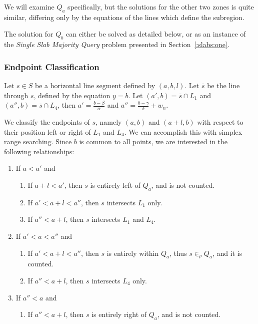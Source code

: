 We will examine $Q_a$ specifically, but the solutions for the other two zones is quite similar, differing only by the equations of the lines which define the subregion.

The solution for $Q_b$ can either be solved as detailed below, or as an instance of the \emph{Single Slab Majority Query} problem presented in Section~\ref{:slabs:one}.


\subsubsection{Endpoint Classification}

Let $s \in S$ be a horizontal line segment defined by $(a, b, l)$.  Let $\overline{s}$ be the line through $s$, defined by the equation $y = b$.  Let $(a', b) = \overline{s} \cap L_1$ and $(a'', b) = \overline{s} \cap L_4$, then $a' = \frac{b - \beta}{\alpha}$ and $a'' = \frac{b - \gamma}{\delta} + w_n$.

We classify the endpoints of $s$, namely $(a, b)$ and $(a + l, b)$ with respect to their position left or right of $L_1$ and $L_4$. We can accomplish this with simplex range searching. Since $b$ is common to all points, we are interested in the following relationships:

\begin{enumerate}
 \item If $a < a'$ and

 \begin{enumerate}
  \item If $a + l < a'$, then $s$ is entirely left of $Q_a$, and is not counted.
  \item If $a' < a + l < a''$, then $s$ intersects $L_1$ only.
  \item If $a'' < a + l$, then $s$ intersects $L_1$ and $L_4$.
 \end{enumerate}

 \item If $a' < a < a''$ and
 \begin{enumerate}
  \item If $a' < a + l < a''$, then $s$ is entirely within $Q_a$, thus $s \in_\rho Q_a$, and it is counted.
  \item If $a'' < a + l$, then $s$ intersects $L_4$ only.
 \end{enumerate}

 \item If $a'' < a$ and
 \begin{enumerate}
  \item If $a'' < a + l$, then $s$ is entirely right of $Q_a$, and is not counted.
 \end{enumerate}
\end{enumerate}

